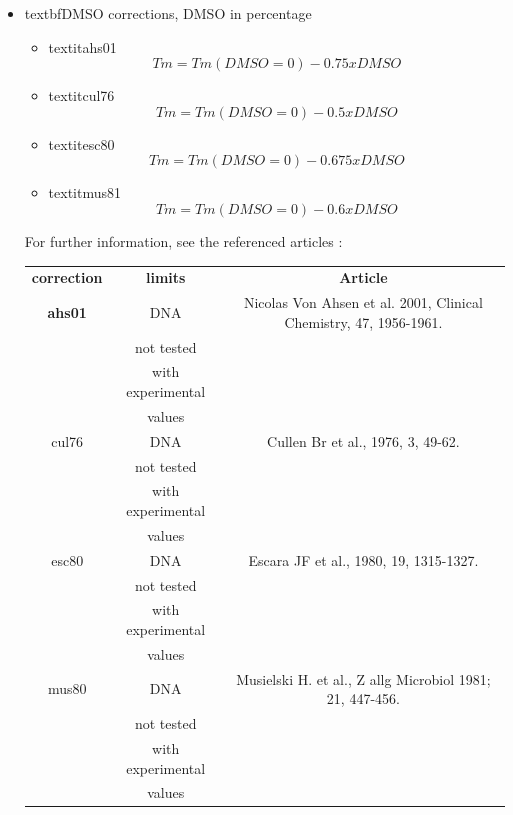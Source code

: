 \documentclass{article}
\begin{document}
\begin{itemize}
\item textbf{DMSO corrections, DMSO in percentage}
  \begin{itemize}
  \item textit{ahs01}
  \begin{displaymath}
  Tm=Tm(DMSO=0)-0.75 x DMSO
  \end{displaymath}
  \item textit{cul76}
  \begin{displaymath}
  Tm=Tm(DMSO=0)-0.5 x DMSO
  \end{displaymath}
  \item textit{esc80}
  \begin{displaymath}
  Tm=Tm(DMSO=0)-0.675 x DMSO
  \end{displaymath}
  \item textit{mus81}
  \begin{displaymath}
  Tm=Tm(DMSO=0)-0.6 x DMSO
  \end{displaymath}
  \end{itemize}
  
For further information, see the referenced articles :
\begin{table}[h]
\begin{tabular}[h]{| c | c | c |}
\textbf{correction} & \textbf{limits} & \textbf{Article} \\ 
\textbf{ahs01} & DNA & Nicolas Von Ahsen et al. 2001, Clinical Chemistry, 47, 1956-1961. \\
 & not tested & \\
 & with experimental & \\
 & values & \\
cul76 & DNA & Cullen Br et al., 1976, 3, 49-62.\\
 & not tested & \\
 & with experimental & \\
 & values & \\
esc80 & DNA & Escara JF et al., 1980, 19, 1315-1327.\\
 & not tested & \\
 & with experimental & \\
 & values & \\
mus80 & DNA & Musielski H. et al., Z allg Microbiol 1981; 21, 447-456.\\
 & not tested & \\
 & with experimental & \\
 & values & \\
\end{tabular}
\end{table}
  

\end{itemize}
\end{document}
